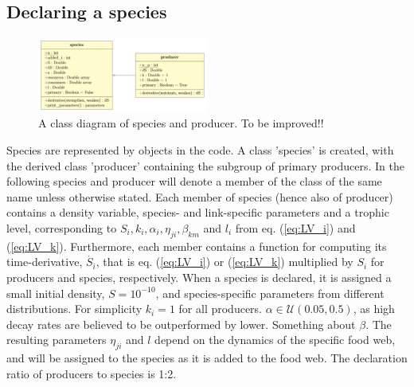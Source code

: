 \subsection{Declaring a species}
\begin{figure}
    \centering
    \includegraphics[width = 0.5\textwidth]{figs/class_diagram.pdf}
    \caption{A class diagram of species and producer. To be improved!!}
    \label{FIG:class}
\end{figure}
Species are represented by objects in the code.
A class 'species' is created, with the derived class 'producer' containing the subgroup of primary producers. 
In the following species and producer will denote a member of the class of the same name unless otherwise stated. Each member of species (hence also of producer) contains a density variable, species- and link-specific parameters and a trophic level, corresponding to $S_i, k_i, \alpha_i, \eta_{ji}, \beta_{km}$ and $l_i$ from eq. (\ref{eq:LV_i}) and (\ref{eq:LV_k}).
Furthermore, each member contains a function for computing its time-derivative, $\dot{S_i}$, that is eq. (\ref{eq:LV_i}) or (\ref{eq:LV_k}) multiplied by $S_i$ for producers and species, respectively. When a species is declared, it is assigned a small initial density, $S = 10^{-10}$, and species-specific parameters from different distributions. For simplicity $k_i = 1$ for all producers. $\alpha \in \mathcal{U}(0.05, 0.5)$, as high decay rates are believed to be outperformed by lower. Something about $\beta$.
The resulting parameters $\eta_{ji}$ and $l$ depend on the dynamics of the specific food web, and will be assigned to the species as it is added to the food web. The declaration ratio of producers to species is 1:2. %


